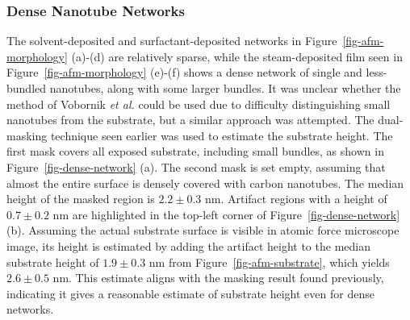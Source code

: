 \documentclass[
  a4paper,
]{scrbook}
\begin{document}
\hypertarget{dense-nanotube-networks}{%
\subsubsection*{Dense Nanotube Networks}\label{dense-nanotube-networks}}

The solvent-deposited and surfactant-deposited networks in
Figure~\ref{fig-afm-morphology} (a)-(d) are relatively sparse, while the
steam-deposited film seen in Figure~\ref{fig-afm-morphology} (e)-(f)
shows a dense network of single and less-bundled nanotubes, along with
some larger bundles. It was unclear whether the method of Vobornik
\emph{et al.} could be used due to difficulty distinguishing small
nanotubes from the substrate, but a similar approach was attempted. The
dual-masking technique seen earlier was used to estimate the substrate
height. The first mask covers all exposed substrate, including small
bundles, as shown in Figure~\ref{fig-dense-network} (a). The second mask
is set empty, assuming that almost the entire surface is densely covered
with carbon nanotubes. The median height of the masked region is
\(2.2 \pm 0.3\) nm. Artifact regions with a height of \(0.7 \pm 0.2\) nm
are highlighted in the top-left corner of Figure~\ref{fig-dense-network}
(b). Assuming the actual substrate surface is visible in atomic force
microscope image, its height is estimated by adding the artifact height
to the median substrate height of \(1.9 \pm 0.3\) nm from
Figure~\ref{fig-afm-substrate}, which yields \(2.6 \pm 0.5\) nm. This
estimate aligns with the masking result found previously, indicating it
gives a reasonable estimate of substrate height even for dense networks.
\end{document}
